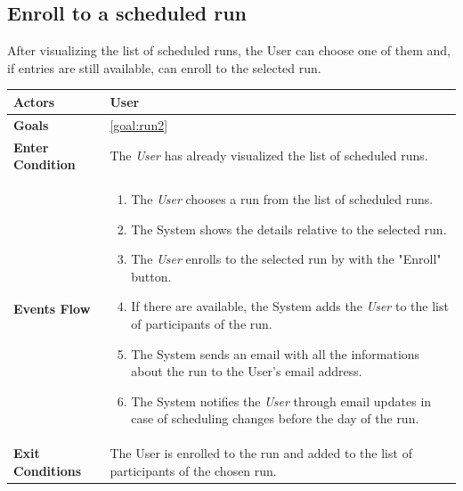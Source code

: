   \subsection{Enroll to a scheduled run}
After visualizing the list of scheduled runs, the User can choose one of them and, if entries are still available, can enroll to the selected run. 

\begin{table}[H]
	\centering
    
    \begin{tabular}{|p{3.5cm}|p{10.3cm}|}
    
    \hline
    \textbf{\large{Actors}} & User	 \\		
    \hline
    \textbf{\large{Goals}} 				& \ref{goal:run2}\\
    
    \hline
    \textbf{\large{Enter Condition}}	& The \emph{User} has already visualized the list of scheduled runs.\\
    
    \hline
    \textbf{\large{Events Flow}}		& \begin{enumerate}[leftmargin=0.5cm]
                                          	\item The \emph{User} chooses a run from the list of scheduled runs. 
                                          	 \item The System shows the details relative to the selected run.
                                            \item The \emph{User} enrolls to the selected run by with the "Enroll" button.
                                            \item If there are available, the System adds the \emph{User} to the list of participants of the run.
                                             \item The System sends an email with all the informations about the run to the User's email address.
                                              \item The System notifies the \emph{User} through email updates in case of scheduling changes before the day of the run.
                                             \end{enumerate}
    										\\
    \hline
    \textbf{\large{Exit Conditions}}    & The User is enrolled to the run and added to the list of participants of the chosen run.  \\
    

\end{tabular}
\end{table}
